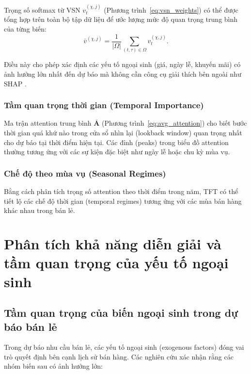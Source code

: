 Trọng số softmax từ VSN $v^{(\chi,j)}_t$ (Phương trình~\ref{eq:vsn_weights}) có thể được tổng hợp trên toàn bộ tập dữ liệu để ước lượng mức độ quan trọng trung bình của từng biến:
\begin{equation}
    \bar{v}^{(\chi,j)} = \frac{1}{|\Omega|} \sum_{(t,\tau) \in \Omega} v^{(\chi,j)}_t.
    \label{eq:var_importance}
\end{equation}

Điều này cho phép xác định các yếu tố ngoại sinh (giá, ngày lễ, khuyến mãi) có ảnh hưởng lớn nhất đến dự báo mà không cần công cụ giải thích bên ngoài như SHAP \citep{lundberg2017unified}.

\subsubsection{Tầm quan trọng thời gian (Temporal Importance)}

Ma trận attention trung bình $\bar{\mathbf{A}}$ (Phương trình~\ref{eq:avg_attention}) cho biết bước thời gian quá khứ nào trong cửa sổ nhìn lại (lookback window) quan trọng nhất cho dự báo tại thời điểm hiện tại. Các đỉnh (peaks) trong biểu đồ attention thường tương ứng với các sự kiện đặc biệt như ngày lễ hoặc chu kỳ mùa vụ.

\subsubsection{Chế độ theo mùa vụ (Seasonal Regimes)}

Bằng cách phân tích trọng số attention theo thời điểm trong năm, TFT có thể tiết lộ các chế độ thời gian (temporal regimes) tương ứng với các mùa bán hàng khác nhau trong bán lẻ.

\section{Phân tích khả năng diễn giải và tầm quan trọng của yếu tố ngoại sinh}
\label{sec:interpretability}

\subsection{Tầm quan trọng của biến ngoại sinh trong dự báo bán lẻ}
\label{subsec:ngoai_sinh}

Trong dự báo nhu cầu bán lẻ, các yếu tố ngoại sinh (exogenous factors) đóng vai trò quyết định bên cạnh lịch sử bán hàng. Các nghiên cứu \citep{syntetos2005accuracy,lim2021temporal} xác nhận rằng các nhóm biến sau có ảnh hưởng lớn:

